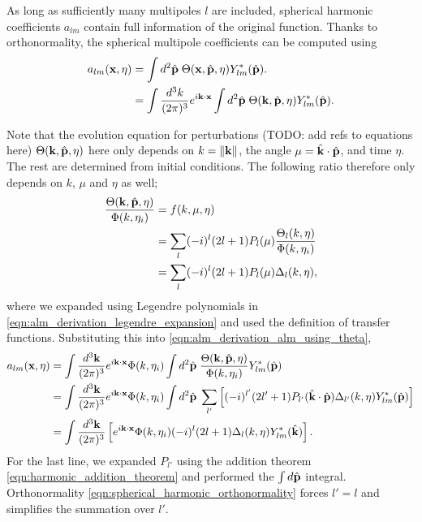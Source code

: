As long as sufficiently many multipoles $l$ are included, spherical harmonic coefficients $a_{lm}$ contain full information of the original function. Thanks to orthonormality, the spherical multipole coefficients can be computed using
\begin{align}
	a_{lm} (\mathbf{x},\eta) &= \int d^2\hat{\mathbf{p}} \; \Theta(\mathbf{x}, \hat{\mathbf{p}},\eta) Y^*_{lm} (\hat{\mathbf{p}}). \\
	&= \int \frac{d^3 k}{(2\pi)^3} e^{i\mathbf{k}\cdot\mathbf{x}} \int d^2\hat{\mathbf{p}} \; \Theta(\mathbf{k},\hat{\mathbf{p}},\eta) Y^*_{lm}(\hat{\mathbf{p}}). \label{eqn:alm_derivation_alm_using_theta}
\end{align}

Note that the evolution equation for perturbations (TODO: add refs to equations here) $\Theta(\mathbf{k},\hat{\mathbf{p}},\eta)$ here only depends on $k=\|\mathbf{k}\|$, the angle $\mu = \hat{\mathbf{k}} \cdot \hat{\mathbf{p}}$, and time $\eta$. The rest are determined from initial conditions. The following ratio therefore only depends on $k$, $\mu$ and $\eta$ as well;
\begin{align}
	\frac{\Theta(\mathbf{k},\hat{\mathbf{p}},\eta)}{\Phi(k,\eta_i)} &= f(k, \mu, \eta) \\
	&= \sum_l (-i)^l (2l+1) P_l(\mu) \frac{\Theta_l(k,\eta)}{\Phi(k,\eta_i)} \label{eqn:alm_derivation_legendre_expansion}\\ 
	&= \sum_l (-i)^l (2l+1) P_l(\mu) \Delta_l(k,\eta),
\end{align}
where we expanded using Legendre polynomials in \eqref{eqn:alm_derivation_legendre_expansion} and used the definition of transfer functions. Substituting this into \eqref{eqn:alm_derivation_alm_using_theta},
\begin{align}
	a_{lm}(\mathbf{x},\eta) &= \int \frac{d^3\mathbf{k}}{(2\pi)^3} e^{i\mathbf{k}\cdot\mathbf{x}} \Phi(k, \eta_i) \int d^2\hat{\mathbf{p}} \; \frac{\Theta(\mathbf{k},\hat{\mathbf{p}},\eta)}{\Phi(k, \eta_i)} Y^*_{lm}(\hat{\mathbf{p}}) \\
	&= \int \frac{d^3\mathbf{k}}{(2\pi)^3} e^{i\mathbf{k}\cdot\mathbf{x}} \Phi(k, \eta_i) \int d^2\hat{\mathbf{p}} \; \sum_{l'} \left[ (-i)^{l'} (2l'+1) P_{l'}(\hat{\mathbf{k}}\cdot\hat{\mathbf{p}}) \Delta_{l'}(k,\eta) Y^*_{lm}(\hat{\mathbf{p}}) \right] \\
	&= \int \frac{d^3\mathbf{k}}{(2\pi)^3} \left[ e^{i\mathbf{k}\cdot\mathbf{x}} \Phi(k, \eta_i) (-i)^{l} (2l+1) \Delta_{l}(k,\eta) Y^*_{lm}(\hat{\mathbf{k}}) \right].
\end{align}
For the last line, we expanded $P_{l'}$ using the addition theorem \eqref{eqn:harmonic_addition_theorem} and performed the $\int d\hat{\mathbf{p}}$ integral. Orthonormality \eqref{eqn:spherical_harmonic_orthonormality} forces $l'=l$ and simplifies the summation over $l'$.

